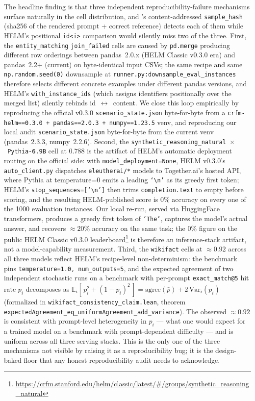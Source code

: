 The headline finding is that three independent reproducibility-failure
  mechanisms surface naturally in the cell distribution, and \eee{}'s
  content-addressed \texttt{sample\_hash} (sha256 of the rendered prompt +
  correct reference) detects each of them while HELM's positional \texttt{id<i>}
  comparison would silently miss two of the three.
First, the \texttt{entity\_matching} \texttt{join\_failed} cells are caused by
  \texttt{pd.merge} producing different row orderings between pandas~2.0.x (HELM
  Classic v0.3.0 era) and pandas~2.2+ (current) on byte-identical input CSVs;
  the same recipe and same \texttt{np.random.seed(0)} downsample at
  \texttt{runner.py:downsample\_eval\_instances} therefore selects different
  concrete examples under different pandas versions, and HELM's
  \texttt{with\_instance\_ids} (which assigns identifiers positionally over the
  merged list) silently rebinds id~$\leftrightarrow$~content.
We close this loop empirically by reproducing the official v0.3.0
  \texttt{scenario\_state.json} byte-for-byte from a \texttt{crfm-helm==0.3.0 +
  pandas==2.0.3 + numpy==1.23.5} venv, and reproducing our local audit
  \texttt{scenario\_state.json} byte-for-byte from the current venv
  (pandas~2.3.3, numpy~2.2.6).
Second, the \texttt{synthetic\_reasoning\_natural~$\times$~Pythia-6.9B} cell at
  $0.788$ is the artifact of HELM's automatic deployment routing on the official
  side: with \texttt{model\_deployment=None}, HELM v0.3.0's
  \texttt{auto\_client.py} dispatches \texttt{eleutherai/*} models to
  Together.ai's hosted API, where Pythia at temperature=0 emits a leading
  \texttt{`\textbackslash n'} as its greedy first token; HELM's
  \texttt{stop\_sequences=[`\textbackslash n']} then trims
  \texttt{completion.text} to empty before scoring, and the resulting
  HELM-published score is $0\%$ accuracy on every one of the 1000 evaluation
  instances.
Our local re-run, served via HuggingFace transformers, produces a greedy first
  token of \texttt{`The'}, captures the model's actual answer, and recovers
  $\approx 20\%$ accuracy on the same task; the $0\%$ figure on the public HELM
  Classic v0.3.0 leaderboard\footnote{
  \url{https://crfm.stanford.edu/helm/classic/latest/\#/groups/synthetic_reasoning_natural}
  } is therefore an inference-stack artifact, not a model-capability
  measurement.
Third, the \texttt{wikifact} cells at $\approx 0.92$ across all three models
  reflect HELM's recipe-level non-determinism: the benchmark pins
  \texttt{temperature=1.0, num\_outputs=5}, and the expected agreement of two
  independent stochastic runs on a benchmark with per-prompt
  \texttt{exact\_match@5} hit rate $p_i$ decomposes as $\mathbb{E}_i[\,p_i^2 +
  (1-p_i)^2\,] = \text{agree}(\bar p) + 2\,\mathrm{Var}_i(p_i)$ (formalized in
  \texttt{wikifact\_consistency\_claim.lean}, theorem
  \texttt{expectedAgreement\_eq\_uniformAgreement\_add\_variance}).
The observed $\approx 0.92$ is consistent with prompt-level heterogeneity in
  $p_i$ — what one would expect for a trained model on a benchmark with
  prompt-dependent difficulty — and is uniform across all three serving stacks.
This is the only one of the three mechanisms not visible by raising it as a
  reproducibility bug; it is the design-baked floor that any honest
  reproducibility audit needs to acknowledge.

